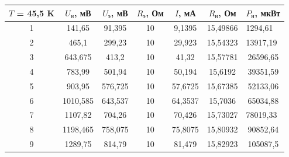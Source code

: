 \documentclass[a4paper, 12pt]{article} %
\begin{document}
\begin{center}
\begin{tabular}{|c|c|c|c|c|c|c|}
\hline
\textbf{$T$ = 45,5 K} & $U_\text{н}$, мВ & $U_\text{э}$, мВ & $R_\text{э}$, Ом & $I$, мА & $R_\text{н}$, Ом & $P_\text{н}$, мкВт              \\ \hline
1                     & 141,65           & 91,395          & 10               & 9,1395  & 15,49866         & \multicolumn{1}{l|}{1294,61}  \\ \hline
2                     & 465,1            & 299,23          & 10               & 29,923  & 15,54323         & \multicolumn{1}{l|}{13917,19} \\ \hline
3                     & 643,675          & 413,2           & 10               & 41,32   & 15,57781         & 26596,65                      \\ \hline
4                     & 783,99           & 501,94          & 10               & 50,194  & 15,6192          & 39351,59                      \\ \hline
5                     & 903,95           & 576,725         & 10               & 57,6725 & 15,67385         & 52133,06                      \\ \hline
6                     & 1010,585         & 643,537         & 10               & 64,3537 & 15,7036          & 65034,88                      \\ \hline
7                     & 1107,82          & 704,26          & 10               & 70,426  & 15,73027         & \multicolumn{1}{l|}{78019,33} \\ \hline
8                     & 1198,465         & 758,075         & 10               & 75,8075 & 15,80932         & 90852,64                      \\ \hline
9                     & 1289,75          & 814,79          & 10               & 81,479  & 15,82923         & 105087,5                      \\ \hline
\end{tabular}
\end{center}
\end{document}
